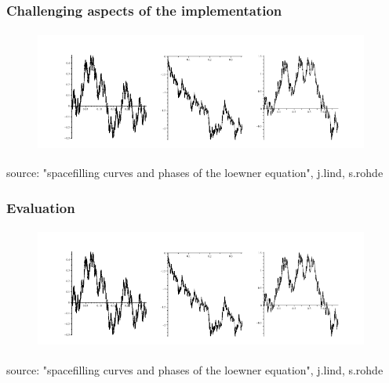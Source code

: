 \documentclass[10pt, compress]{beamer}
\begin{document}
\begin{frame}[fragile]
  \frametitle{Challenging aspects of the implementation}




\begin{figure}
  \centering
 \includegraphics[width=11cm,height=4cm]{intro2.png}
\end{figure}
\tiny
source: "spacefilling curves and phases of the loewner equation", j.lind, s.rohde
\normalsize
\end{frame}

\begin{frame}[fragile]
  \frametitle{Evaluation}

  

\begin{figure}
  \centering
 \includegraphics[width=11cm,height=4cm]{intro2.png}
\end{figure}
\tiny
source: "spacefilling curves and phases of the loewner equation", j.lind, s.rohde
\normalsize
\end{frame}
\end{document}
